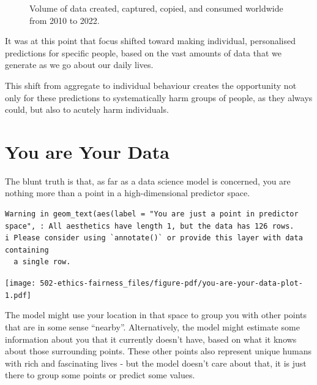 \documentclass[
  letterpaper,
  DIV=11,
  numbers=noendperiod]{scrreprt}
\begin{document}
\begin{figure}


\caption{\label{fig-global-data-barplot}Volume of data created,
captured, copied, and consumed worldwide from 2010 to 2022.}

\end{figure}%

It was at this point that focus shifted toward making individual,
personalised predictions for specific people, based on the vast amounts
of data that we generate as we go about our daily lives.

This shift from aggregate to individual behaviour creates the
opportunity not only for these predictions to systematically harm groups
of people, as they always could, but also to acutely harm individuals.

\section{You are Your Data}\label{you-are-your-data}

The blunt truth is that, as far as a data science model is concerned,
you are nothing more than a point in a high-dimensional predictor space.

\begin{verbatim}
Warning in geom_text(aes(label = "You are just a point in predictor space", : All aesthetics have length 1, but the data has 126 rows.
i Please consider using `annotate()` or provide this layer with data containing
  a single row.
\end{verbatim}

\begin{center}
\texttt{[image: 502-ethics-fairness\_files/figure-pdf/you-are-your-data-plot-1.pdf]}
\end{center}

The model might use your location in that space to group you with other
points that are in some sense ``nearby''. Alternatively, the model might
estimate some information about you that it currently doesn't have,
based on what it knows about those surrounding points. These other
points also represent unique humans with rich and fascinating lives -
but the model doesn't care about that, it is just there to group some
points or predict some values.
\end{document}

